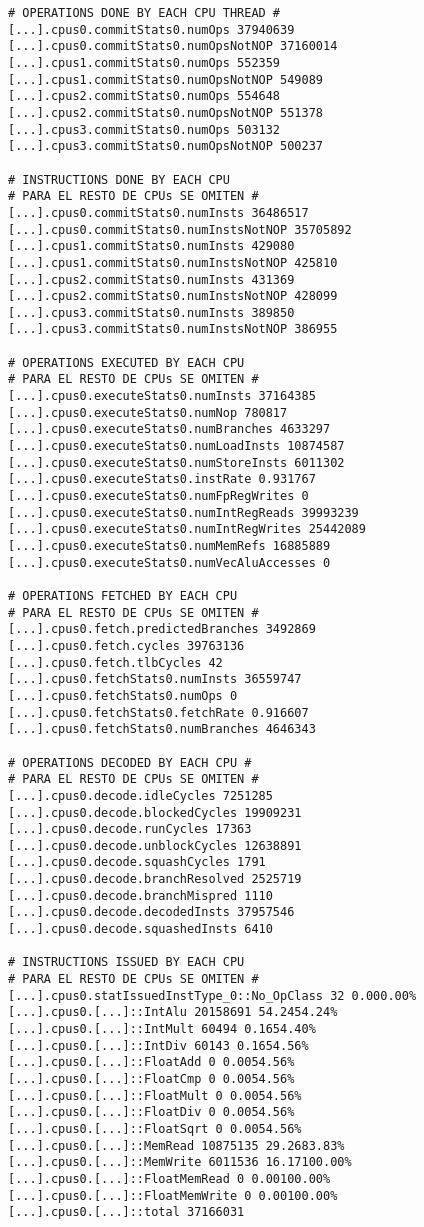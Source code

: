 \begin{lstlisting}[basicstyle=\ttfamily,label=metricasCompletas,showstringspaces=false]
# OPERATIONS DONE BY EACH CPU THREAD #
[...].cpus0.commitStats0.numOps 37940639
[...].cpus0.commitStats0.numOpsNotNOP 37160014
[...].cpus1.commitStats0.numOps 552359
[...].cpus1.commitStats0.numOpsNotNOP 549089
[...].cpus2.commitStats0.numOps 554648
[...].cpus2.commitStats0.numOpsNotNOP 551378
[...].cpus3.commitStats0.numOps 503132
[...].cpus3.commitStats0.numOpsNotNOP 500237

# INSTRUCTIONS DONE BY EACH CPU
# PARA EL RESTO DE CPUs SE OMITEN #
[...].cpus0.commitStats0.numInsts 36486517
[...].cpus0.commitStats0.numInstsNotNOP 35705892
[...].cpus1.commitStats0.numInsts 429080
[...].cpus1.commitStats0.numInstsNotNOP 425810
[...].cpus2.commitStats0.numInsts 431369
[...].cpus2.commitStats0.numInstsNotNOP 428099
[...].cpus3.commitStats0.numInsts 389850
[...].cpus3.commitStats0.numInstsNotNOP 386955

# OPERATIONS EXECUTED BY EACH CPU
# PARA EL RESTO DE CPUs SE OMITEN #
[...].cpus0.executeStats0.numInsts 37164385
[...].cpus0.executeStats0.numNop 780817
[...].cpus0.executeStats0.numBranches 4633297
[...].cpus0.executeStats0.numLoadInsts 10874587
[...].cpus0.executeStats0.numStoreInsts 6011302
[...].cpus0.executeStats0.instRate 0.931767
[...].cpus0.executeStats0.numFpRegWrites 0
[...].cpus0.executeStats0.numIntRegReads 39993239
[...].cpus0.executeStats0.numIntRegWrites 25442089
[...].cpus0.executeStats0.numMemRefs 16885889
[...].cpus0.executeStats0.numVecAluAccesses 0

# OPERATIONS FETCHED BY EACH CPU
# PARA EL RESTO DE CPUs SE OMITEN #
[...].cpus0.fetch.predictedBranches 3492869
[...].cpus0.fetch.cycles 39763136
[...].cpus0.fetch.tlbCycles 42
[...].cpus0.fetchStats0.numInsts 36559747
[...].cpus0.fetchStats0.numOps 0
[...].cpus0.fetchStats0.fetchRate 0.916607
[...].cpus0.fetchStats0.numBranches 4646343

# OPERATIONS DECODED BY EACH CPU #
# PARA EL RESTO DE CPUs SE OMITEN #
[...].cpus0.decode.idleCycles 7251285
[...].cpus0.decode.blockedCycles 19909231
[...].cpus0.decode.runCycles 17363
[...].cpus0.decode.unblockCycles 12638891
[...].cpus0.decode.squashCycles 1791
[...].cpus0.decode.branchResolved 2525719
[...].cpus0.decode.branchMispred 1110
[...].cpus0.decode.decodedInsts 37957546
[...].cpus0.decode.squashedInsts 6410

# INSTRUCTIONS ISSUED BY EACH CPU 
# PARA EL RESTO DE CPUs SE OMITEN #
[...].cpus0.statIssuedInstType_0::No_OpClass 32 0.000.00%
[...].cpus0.[...]::IntAlu 20158691 54.2454.24%
[...].cpus0.[...]::IntMult 60494 0.1654.40%
[...].cpus0.[...]::IntDiv 60143 0.1654.56%
[...].cpus0.[...]::FloatAdd 0 0.0054.56%
[...].cpus0.[...]::FloatCmp 0 0.0054.56%
[...].cpus0.[...]::FloatMult 0 0.0054.56%
[...].cpus0.[...]::FloatDiv 0 0.0054.56%
[...].cpus0.[...]::FloatSqrt 0 0.0054.56%
[...].cpus0.[...]::MemRead 10875135 29.2683.83%
[...].cpus0.[...]::MemWrite 6011536 16.17100.00%
[...].cpus0.[...]::FloatMemRead 0 0.00100.00%
[...].cpus0.[...]::FloatMemWrite 0 0.00100.00%
[...].cpus0.[...]::total 37166031


\end{lstlisting}

